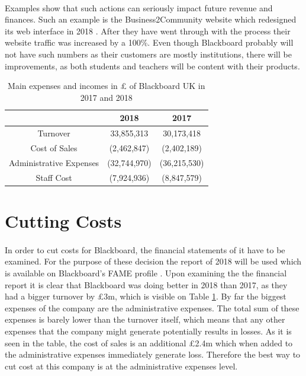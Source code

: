 \documentclass[]{article}
\begin{document}
\paragraph{}
Examples show that such actions can seriously impact future revenue and finances. Such an example is the Business2Community website which redesigned its web interface in 2018 \cite{Redesign-case-study}. After they have went through with the process their website traffic was increased by a 100\%. Even though Blackboard probably will not have such numbers as their customers are mostly institutions, there will be improvements, as both students and teachers will be content with their products.


\begin{table}
\centering
\begin{tabular}{||c | c | c ||} 
\hline
 & 2018 & 2017 \\ [0.5ex] 
\hline\hline
Turnover & 33,855,313 & 30,173,418 \\ 
\hline
Cost of Sales & (2,462,847) & (2,402,189) \\ 
\hline
Administrative Expenses & (32,744,970) & (36,215,530) \\ 
\hline
Staff Cost & (7,924,936) & (8,847,579) \\ 
\hline
\end{tabular}
\caption{Main expenses and incomes in £ of Blackboard UK in 2017 and 2018 \cite{FAME-Blackboard}}
\label{tab:Statement-BB}
\end{table}

\section{Cutting Costs}
\paragraph{}
In order to cut costs for Blackboard, the financial statements of it have to be examined. For the purpose of these decision the report of 2018 will be used which is available on Blackboard's FAME profile \cite{FAME-Blackboard}. Upon examining the the financial report it is clear that Blackboard was doing better in 2018 than 2017, as they had a bigger turnover by £3m, which is visible on Table \ref{tab:Statement-BB}. By far the biggest expenses of the company are the administrative expenses. The total sum of these expenses is barely lower than the turnover itself, which means that any other expenses that the company might generate potentially results in losses. As it is seen in the table, the cost of sales is an additional £2.4m which when added to the administrative expenses immediately generate loss. Therefore the best way to cut cost at this company is at the administrative expenses level. 
\end{document}
